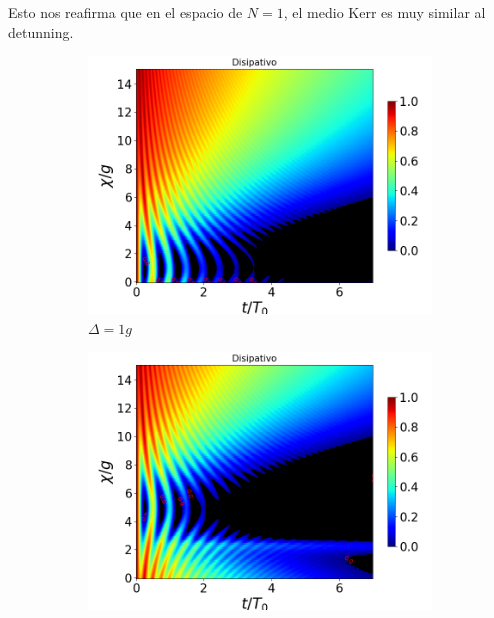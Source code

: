 Esto nos reafirma que en el espacio de $N=1$, el medio Kerr es muy similar al detunning. 

\begin{figure}[h!]
    \centering
    \begin{subfigure}{0.49\textwidth}
        \includegraphics[width=\textwidth]{figuras/ch4/concu/chi/eg0+ge0 d=1.0g k=0.0g J=0.0g gamma=0.25g concu chi dis.png}
        \caption{$\Delta=1g$}
        \label{fig4:concu x d1}
    \end{subfigure}
    \hfill
    \begin{subfigure}{0.49\textwidth}
        \includegraphics[width=\textwidth]{figuras/ch4/concu/chi/eg0+ge0 d=5.0g k=0.0g J=0.0g gamma=0.25g concu chi dis.png}

\end{subfigure}
\end{figure}
